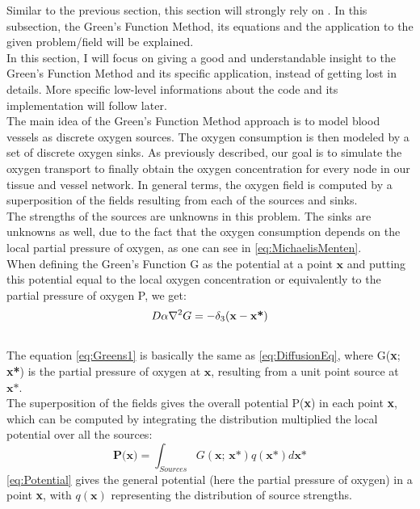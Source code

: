 Similar to the previous section, this section will strongly rely on \cite{Secomb2004}. In this subsection, the Green's Function Method, its equations and the application to the given problem/field will be explained.
\\In this section, I will focus on giving a good and understandable insight to the Green's Function Method and its specific application, instead of getting lost in details. More specific low-level informations about the code and its implementation will follow later.
\\The main idea of the Green's Function Method approach is to model blood vessels as discrete oxygen sources. The oxygen consumption is then modeled by a set of discrete oxygen sinks. As previously described, our goal is to simulate the oxygen transport to finally obtain the oxygen concentration for every node in our tissue and vessel network. In general terms, the oxygen field is computed by a superposition of the fields resulting from each of the sources and sinks.
\\The strengths of the sources are unknowns in this problem. The sinks are unknowns as well, due to the fact that the oxygen consumption depends on the local partial pressure of oxygen, as one can see in \ref{eq:MichaelisMenten}.
%
\\When defining the Green's Function G as the potential at a point $\textbf{x}$ and putting this potential equal to the local oxygen concentration or equivalently to the partial pressure of oxygen P, we get:
\begin{equation}
\\D\alpha\nabla^2G = - \delta_3 
( \textbf{x} - \textbf{x*} )
\label{eq:Greens1}
\end{equation}
\\The equation \ref{eq:Greens1} is basically the same as \ref{eq:DiffusionEq}, where G(\textbf{x}; \textbf{x*}) is the partial pressure of oxygen at $\textbf{x}$, resulting from a unit point source at $\textbf{x*}$.
%
\\The superposition of the fields gives the overall potential P(\textbf{x}) in each point \textbf{x}, which can be computed by integrating the distribution multiplied the local potential over all the sources:
\begin{equation}
\textbf{P(x)} = \int_{Sources} G(\textbf{x; x*})q(\textbf{x*})d\textbf{x*}
\label{eq:Potential}
\end{equation}
\ref{eq:Potential} gives the general potential (here the partial pressure of oxygen) in a point \textbf{x}, with $q(\textbf{x})$ representing the distribution of source strengths.
